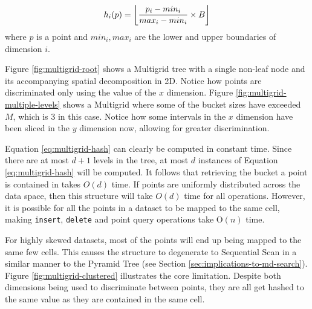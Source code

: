 \begin{equation}
	h_i(p) = \floor*{\frac{p_i - min_i}{max_i - min_i} \times B}
	\label{eq:multigrid-hash}
\end{equation}
where $p$ is a point and $min_i, max_i$ are the lower and upper boundaries of dimension $i$.

Figure \ref{fig:multigrid-root} shows a Multigrid tree with a single non-leaf node and its accompanying spatial decomposition in 2D. Notice how points are discriminated only using the value of the $x$ dimension. Figure \ref{fig:multigrid-multiple-levels} shows a Multigrid where some of the bucket sizes have exceeded $M$, which is 3 in this case. Notice how some intervals in the $x$ dimension have been sliced in the $y$ dimension now, allowing for greater discrimination.

Equation \ref{eq:multigrid-hash} can clearly be computed in constant time. Since there are at most $d + 1$ levels in the tree, at most $d$ instances of Equation \ref{eq:multigrid-hash} will be computed. It follows that retrieving the bucket a point is contained in takes $O(d)$ time. If points are uniformly distributed across the data space, then this structure will take $O(d)$ time for all operations.  However, it is possible for all the points in a dataset to be mapped to the same cell, making \texttt{insert}, \texttt{delete} and point query operations take O$(n)$ time.

For highly skewed datasets, most of the points will end up being mapped to the same few cells. This causes the structure to degenerate to Sequential Scan in a similar manner to the Pyramid Tree (see Section \ref{sec:implications-to-md-search}). Figure \ref{fig:multigrid-clustered} illustrates the core limitation. Despite both dimensions being used to discriminate between points, they are all get hashed to the same value as they are contained in the same cell.

